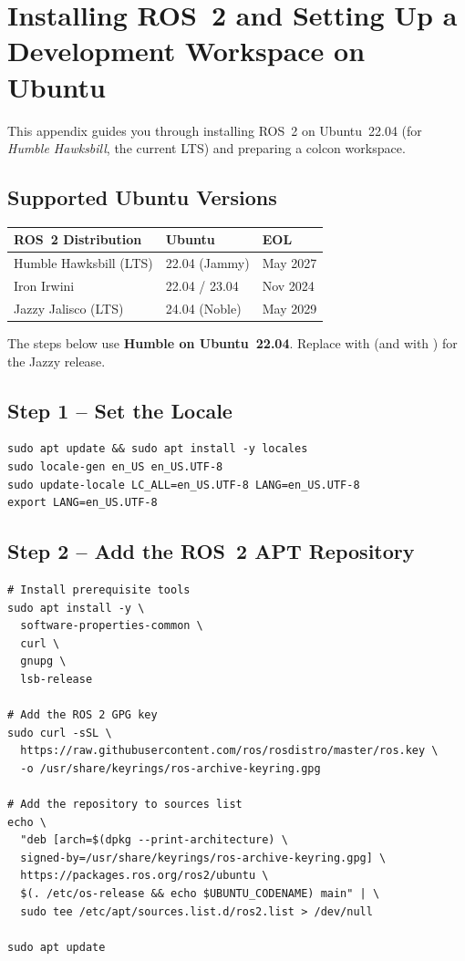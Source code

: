 \documentclass[11pt,a4paper]{csarticle}
\begin{document}
\section{Installing ROS~2 and Setting Up a Development Workspace on Ubuntu}
\label{app:install}

This appendix guides you through installing ROS~2 on Ubuntu~22.04 (for
\emph{Humble Hawksbill}, the current LTS) and preparing a colcon workspace.

\subsection{Supported Ubuntu Versions}

\begin{center}
\begin{tabular}{lll}
  \toprule
  \textbf{ROS~2 Distribution} & \textbf{Ubuntu} & \textbf{EOL} \\
  \midrule
  Humble Hawksbill (LTS) & 22.04 (Jammy) & May 2027 \\
  Iron Irwini             & 22.04 / 23.04 & Nov 2024 \\
  Jazzy Jalisco (LTS)    & 24.04 (Noble) & May 2029 \\
  \bottomrule
\end{tabular}
\end{center}

The steps below use \textbf{Humble on Ubuntu~22.04}.  Replace
 with  (and  with )
for the Jazzy release.

\subsection{Step 1 -- Set the Locale}

\begin{lstlisting}[style=bash]
sudo apt update && sudo apt install -y locales
sudo locale-gen en_US en_US.UTF-8
sudo update-locale LC_ALL=en_US.UTF-8 LANG=en_US.UTF-8
export LANG=en_US.UTF-8
\end{lstlisting}

\subsection{Step 2 -- Add the ROS~2 APT Repository}

\begin{lstlisting}[style=bash]
# Install prerequisite tools
sudo apt install -y \
  software-properties-common \
  curl \
  gnupg \
  lsb-release

# Add the ROS 2 GPG key
sudo curl -sSL \
  https://raw.githubusercontent.com/ros/rosdistro/master/ros.key \
  -o /usr/share/keyrings/ros-archive-keyring.gpg

# Add the repository to sources list
echo \
  "deb [arch=$(dpkg --print-architecture) \
  signed-by=/usr/share/keyrings/ros-archive-keyring.gpg] \
  https://packages.ros.org/ros2/ubuntu \
  $(. /etc/os-release && echo $UBUNTU_CODENAME) main" | \
  sudo tee /etc/apt/sources.list.d/ros2.list > /dev/null

sudo apt update
\end{lstlisting}
\end{document}
